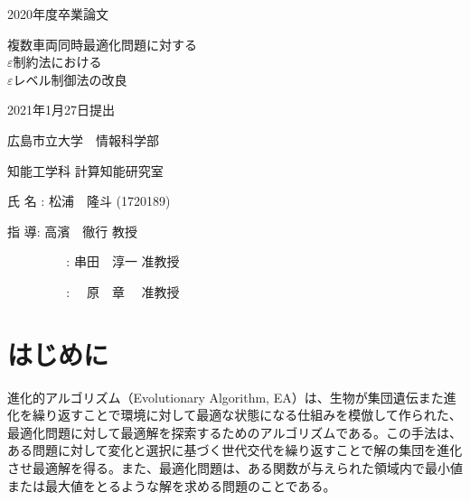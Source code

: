 \documentclass[a4paper,12pt]{jsreport}
\begin{document}
\begin{titlepage}

    {\Large 2020年度卒業論文}

    \begin{center}

        \vspace{10truept}

        \vspace*{120truept}

        {\Huge 複数車両同時最適化問題に対する\\$\varepsilon$制約法における\\$\varepsilon$レベル制御法の改良} 
        
        \vspace{100truept}
        
        {\Large 2021年1月27日提出}

        \vspace{50truept}

        {\Large 広島市立大学　情報科学部}
        
        {\Large 知能工学科  計算知能研究室}

        \vspace{10truept}

        {\Large 氏 名   :     松浦　隆斗 (1720189)}

        \vspace{70truept}

        {\Large 指 導: 高濱　徹行  教授}
        
        {\Large \,\ \ \ \ \ \ \ \ \ : 串田　淳一  准教授}
        
        {\Large \,\ \ \ \ \ \ \ \ \ : 　原　章  　准教授}
        
        \vspace{10truept}

    \end{center}
\end{titlepage}

\tableofcontents




\chapter{はじめに}
進化的アルゴリズム（Evolutionary Algorithm, EA）は、生物が集団遺伝また進化を繰り返すことで環境に対して最適な状態になる仕組みを模倣して作られた、最適化問題に対して最適解を探索するためのアルゴリズムである。この手法は、ある問題に対して変化と選択に基づく世代交代を繰り返すことで解の集団を進化させ最適解を得る。また、最適化問題は、ある関数が与えられた領域内で最小値または最大値をとるような解を求める問題のことである。
\end{document}
